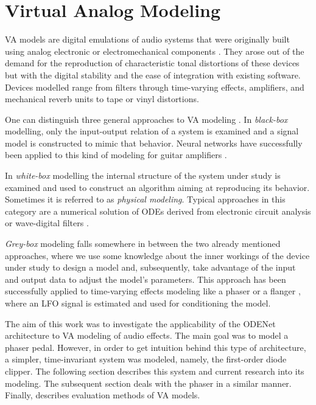 
\chapter{Virtual Analog Modeling}
\label{chapter:virtual_analog_modeling}
\Acf{VA} models are digital emulations of audio systems that were originally built using analog electronic or electromechanical components \cite{Zoelzer2011}. They arose out of the demand for the reproduction of characteristic tonal distortions of these devices but with the digital stability and the ease of integration with existing software. Devices modelled range from filters through time-varying effects, amplifiers, and mechanical reverb units to tape or vinyl distortions.

One can distinguish three general approaches to \ac{VA} modeling \cite{Kiiski2016,Wright2020}. In \emph{black-box} modelling, only the input-output relation of a system is examined and a signal model is constructed to mimic that behavior. Neural networks have successfully been applied to this kind of modeling for guitar amplifiers \cite{Wright2019,Wrightetal2020}. 

In \emph{white-box} modelling the internal structure of the system under study is examined and used to construct an algorithm aiming at reproducing its behavior. Sometimes it is referred to as \emph{physical modeling}. Typical approaches in this category are a numerical solution of \acp{ODE} derived from electronic circuit analysis \cite{Yeh2007,Eichas2014} or wave-digital filters \cite{PASPWEB2010}. 

\emph{Grey-box} modeling falls somewhere in between the two already mentioned approaches, where we use some knowledge about the inner workings of the device under study to design a model and, subsequently, take advantage of the input and output data to adjust the model's parameters. This approach has been successfully applied to time-varying effects modeling like a phaser or a flanger \cite{Kiiski2016,Wright2020}, where an \ac{LFO} signal is estimated and used for conditioning the model.

The aim of this work was to investigate the applicability of the ODENet architecture to \ac{VA} modeling of audio effects. The main goal was to model a phaser pedal. However, in order to get intuition behind this type of architecture, a simpler, time-invariant system was modeled, namely, the first-order diode clipper. The following section describes this system and current research into its modeling. The subsequent section deals with the phaser in a similar manner. Finally,  describes evaluation methods of \ac{VA} models.





